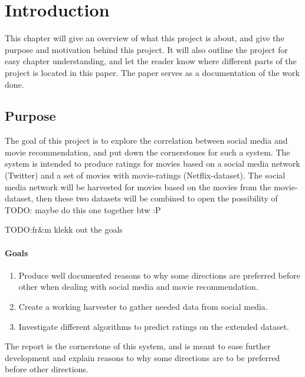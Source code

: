 
\chapter{Introduction}

\minitoc
\setcounter{page}{1}

This chapter will give an overview of what this project is about, and give the purpose and motivation behind this project. It will also outline the project for easy chapter understanding, and let the reader know where different parts of the project is located in this paper. The paper serves as a documentation of the work done.

\clearpage


\section{Purpose}
The goal of this project is to explore the correlation between social media and movie recommendation, and put down the cornerstones for such a system. The system is intended to produce ratings for movies based on a social media network (Twitter) and a set of movies with movie-ratings (Netflix-dataset). The social media network will be harvested for movies based on the movies from the movie-dataset, then these two datasets will be combined to open the possibility of TODO: maybe do this one together btw :P

TODO:fr&m klekk out the goals
\subsubsection{Goals}
\begin{enumerate}
  \item Produce well documented reasons to why some directions are preferred before other when dealing with social media and movie recommendation.
  \item Create a working harvester to gather needed data from social media.
  \item Investigate different algorithms to predict ratings on the extended dataset.
\end{enumerate}

The report is the cornerstone of this system, and is meant to ease further development and explain reasons to why some directions are to be preferred before other directions.


